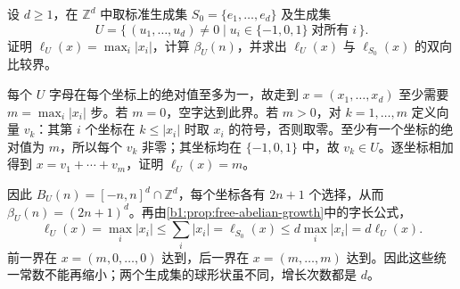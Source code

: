 \begin{exercise}\label{b1:ex:C-growth-cube-generators}
	设 \(d\ge1\)，在 \(\mathbb Z^d\) 中取标准生成集 \(S_0=\{e_1,\ldots,e_d\}\) 及生成集
	\[
		U=\{\,(u_1,\ldots,u_d)\ne0\mid u_i\in\{-1,0,1\}\;\text{对所有}\;i\,\}.
	\]
	证明 \(\ell_U(x)=\max_i|x_i|\)，计算 \(\beta_U(n)\)，并求出 \(\ell_U(x)\) 与 \(\ell_{S_0}(x)\) 的双向比较界。
\end{exercise}
\begin{solution}
	每个 \(U\) 字母在每个坐标上的绝对值至多为一，故走到 \(x=(x_1,\ldots,x_d)\) 至少需要 \(m=\max_i|x_i|\) 步。若 \(m=0\)，空字达到此界。若 \(m>0\)，对 \(k=1,\ldots,m\) 定义向量 \(v_k\)：其第 \(i\) 个坐标在 \(k\le|x_i|\) 时取 \(x_i\) 的符号，否则取零。至少有一个坐标的绝对值为 \(m\)，所以每个 \(v_k\) 非零；其坐标均在 \(\{-1,0,1\}\) 中，故 \(v_k\in U\)。逐坐标相加得到 \(x=v_1+\cdots+v_m\)，证明 \(\ell_U(x)=m\)。

	因此 \(B_U(n)=[-n,n]^d\cap\mathbb Z^d\)，每个坐标各有 \(2n+1\) 个选择，从而 \(\beta_U(n)=(2n+1)^d\)。再由\cref{b1:prop:free-abelian-growth}中的字长公式，
	\[
		\ell_U(x)=\max_i|x_i|
		\le\sum_i|x_i|=\ell_{S_0}(x)
		\le d\max_i|x_i|=d\ell_U(x).
	\]
	前一界在 \(x=(m,0,\ldots,0)\) 达到，后一界在 \(x=(m,\ldots,m)\) 达到。因此这些统一常数不能再缩小；两个生成集的球形状虽不同，增长次数都是 \(d\)。
\end{solution}


